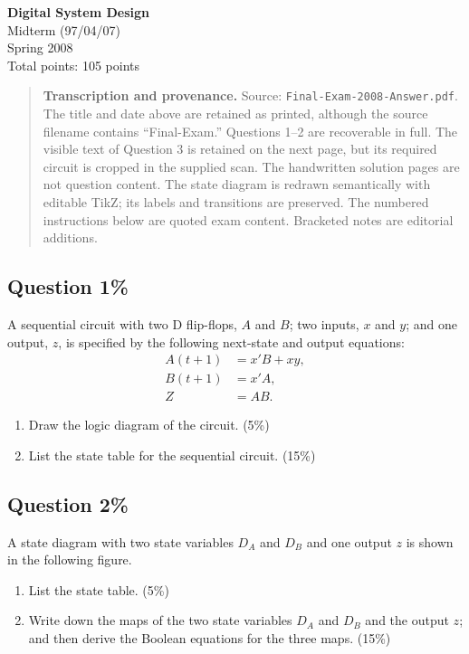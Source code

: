 \documentclass[11pt,a4paper]{article}
\newcommand{\question}[2]{\subsection*{Question #1\hfill\normalfont #2}}
\begin{document}
\begin{center}
  {\LARGE\bfseries Digital System Design}\\[5pt]
  {\large Midterm (97/04/07)\\Spring 2008}\\[5pt]
  Total points: 105 points
\end{center}

\begin{quote}\small
\textbf{Transcription and provenance.} Source: \texttt{Final-Exam-2008-Answer.pdf}.
The title and date above are retained as printed, although the source filename
contains ``Final-Exam.'' Questions 1--2 are recoverable in full. The visible text
of Question 3 is retained on the next page, but its required circuit is cropped
in the supplied scan. The handwritten solution pages are not question content.
The state diagram is redrawn semantically with editable TikZ; its labels and
transitions are preserved. The numbered instructions below are quoted exam
content. Bracketed notes are editorial additions.
\end{quote}

\question{1}{20\%}
A sequential circuit with two D flip-flops, $A$ and $B$; two inputs, $x$ and
$y$; and one output, $z$, is specified by the following next-state and output
equations:
\[
\begin{aligned}
A(t+1)&=x'B+xy,\\
B(t+1)&=x'A,\\
Z&=AB.
\end{aligned}
\]
\begin{enumerate}[label=(\alph*)]
\item Draw the logic diagram of the circuit. (5\%)
\item List the state table for the sequential circuit. (15\%)
\end{enumerate}

\question{2}{20\%}
A state diagram with two state variables $D_A$ and $D_B$ and one output $z$
is shown in the following figure.
\begin{enumerate}[label=(\alph*)]
\item List the state table. (5\%)
\item Write down the maps of the two state variables $D_A$ and $D_B$ and the
output $z$; and then derive the Boolean equations for the three maps. (15\%)
\end{enumerate}
\end{document}
